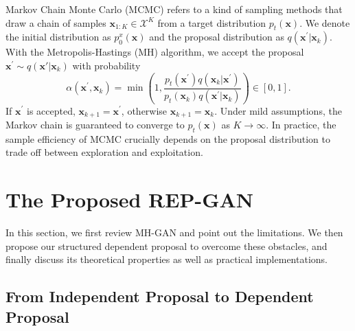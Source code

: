 \documentclass[runningheads]{llncs}
\newcommand{\bx}{\mathbf{x}}
\newcommand{\cX}{\mathcal{X}}
\newcommand{\<}{\left\langle}
\renewcommand{\>}{\right\rangle}
\begin{document}
Markov Chain Monte Carlo (MCMC) refers to a kind of sampling methods that draw a chain of samples $\bx_{1:K}\in\cX^K$ from a target distribution $p_t(\bx)$. We denote the initial distribution as $p^x_0(\bx)$ and the proposal distribution as $q(\bx^\prime|\bx_k)$. With the Metropolis-Hastings (MH) algorithm, we accept the proposal $\bx^\prime\sim q(\bx'|\bx_k)$ with probability
\begin{equation}
\alpha\left(\mathbf{x}^{\prime}, \mathbf{x}_{k}\right)=\min \left(1, \frac{p_t\left(\mathbf{x}^{\prime}\right) q\left(\mathbf{x}_{k}|\bx^\prime\right)}{p_t\left(\mathbf{x}_{k}\right) q\left(\mathbf{x}^{\prime}|\bx_k\right)}\right) \in[0,1].   
\label{eq:mh-accept} 
\end{equation}
If $\bx^{\prime}$ is accepted, $\bx_{k+1}=\bx^{\prime}$, otherwise $\bx_{k+1}=\bx_{k}$. Under mild assumptions, the Markov chain is guaranteed to converge to $p_t(\bx)$ as $K\to\infty$. In practice, the sample efficiency of MCMC crucially depends on the proposal distribution to trade off between exploration and exploitation. 

\section{The Proposed REP-GAN}
\label{sec:emhgan}
In this section, we first review MH-GAN and point out the limitations. We then propose our structured dependent proposal to overcome these obstacles, and finally discuss its theoretical properties as well as practical implementations.

\subsection{From Independent Proposal to Dependent Proposal}
\end{document}
